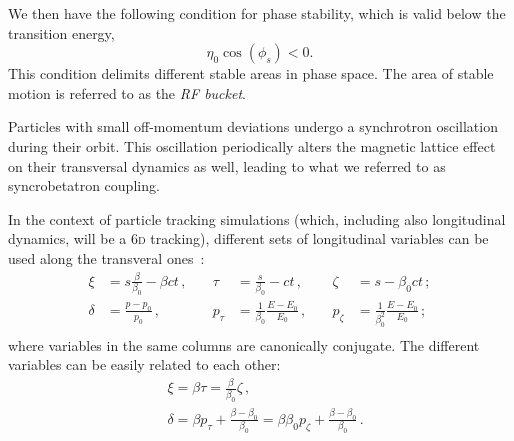 We then have the following condition for phase stability, which is valid below the transition energy,
\begin{equation}
    \eta_0 \cos \left(\phi_s\right)<0 .
\end{equation}
This condition delimits different stable areas in phase space. The area of stable motion is referred to as the \textit{RF bucket}. %

Particles with small off-momentum deviations undergo a synchrotron oscillation during their orbit. This oscillation periodically alters the magnetic lattice effect on their transversal dynamics as well, leading to what we referred to as syncrobetatron coupling.

In the context of particle tracking simulations (which, including also longitudinal dynamics, will be a 6\textsc{d} tracking), different sets of longitudinal variables can be used along the transveral ones~\cite{}:
\begin{equation}
    \begin{aligned}
    \xi &= s \frac{\beta}{\beta_0}-\beta c t \,,\quad& \tau &= \frac{s}{\beta_0}-c t \,,\quad& \zeta &= s-\beta_0 c t \,;\\
    \delta &= \frac{p-p_0}{p_0} \,,\quad& p_\tau &= \frac{1}{\beta_0} \frac{E-E_0}{E_0} \,,\quad& p_\zeta &= \frac{1}{\beta_0^2} \frac{E-E_0}{E_0}\,; \\
    \end{aligned}
\end{equation}
where variables in the same columns are canonically conjugate.
The different variables can be easily related to each other:
\begin{equation}
    \begin{aligned}
    &\xi=\beta \tau=\frac{\beta}{\beta_0} \zeta \,,\\
    &\delta=\beta p_\tau+\frac{\beta-\beta_0}{\beta_0}=\beta \beta_0 p_\zeta+\frac{\beta-\beta_0}{\beta_0} \,.
    \end{aligned}
\end{equation}

\parseparator
